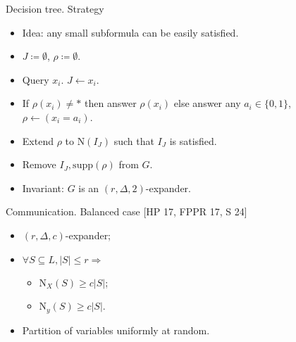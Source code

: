 \begin{frame}{Decision tree. Strategy}

    \begin{itemize}
        \item Idea: any small subformula can be easily satisfied.
    \end{itemize}

    \pause
    \vspace{0.5cm}

    \begin{itemize}
        \item $J \coloneqq \emptyset$, $\rho \coloneqq \emptyset$.
            \pause
        \item Query $x_i$. $J \gets x_i$.
            \pause
        \item If $\rho(x_i) \neq *$ then answer $\rho(x_i)$ else
            answer any $a_i \in \{0, 1\}$, $\rho \gets (x_i = a_i)$.
            \pause
        \item Extend $\rho$ to $\mathrm{N}(I_J)$ such that $I_J$ is
            satisfied.
        \item Remove $I_J, \mathrm{supp}(\rho)$ from $G$.
    \end{itemize}

    \pause
    \vspace{0.5cm}
    \begin{itemize}
        \item Invariant: $G$ is an $(r, \Delta, 2)$-expander.
    \end{itemize}

\end{frame}


\begin{frame}{Communication. Balanced case [HP 17, FPPR 17, S 24]}
    \begin{minipage}{0.38\linewidth}
        \centering
        
    \end{minipage}
    \begin{minipage}{0.58\linewidth}
        \begin{itemize}
            \item $(r, \Delta, c)$-expander;
            \item $\forall S \subseteq L, |S| \le r \Rightarrow$
                \begin{itemize}
                    \item $\mathrm{N}_{X}(S) \ge c |S|$;
                    \item $\mathrm{N}_{y}(S) \ge c |S|$.
                \end{itemize}
        \end{itemize}
    \end{minipage}

    \pause
    \begin{itemize}
        \item Partition of variables uniformly at random.
    \end{itemize}
\end{frame}


